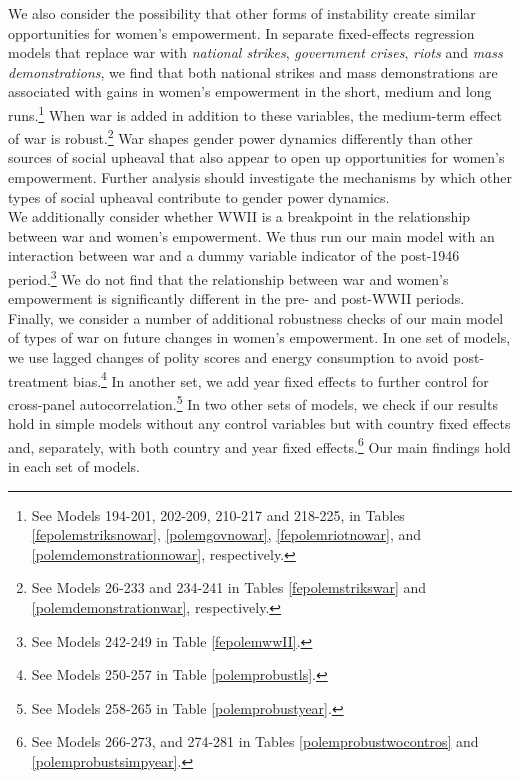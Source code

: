 We also consider the possibility that other forms of instability create similar opportunities for women's empowerment. In separate fixed-effects regression models that replace war with {\it national strikes}, {\it government crises}, {\it riots} and {\it mass demonstrations}, we find that both national strikes and mass demonstrations are associated with gains in women's empowerment in the short, medium and long runs.\footnote{See Models 194-201, 202-209, 210-217 and 218-225, in Tables \ref{fepolemstriksnowar}, \ref{polemgovnowar}, \ref{fepolemriotnowar}, and \ref{polemdemonstrationnowar}, respectively. } When war is added in addition to these variables, the medium-term effect of war is robust.\footnote{See Models 26-233 and 234-241 in Tables \ref{fepolemstrikswar} and \ref{polemdemonstrationwar}, respectively. } War shapes gender power dynamics differently than other sources of social upheaval that also appear to open up opportunities for women's empowerment. Further analysis should investigate the mechanisms by which other types of social upheaval contribute to gender power dynamics.\\

We additionally consider whether WWII is a breakpoint in the relationship between war and women's empowerment. We thus run our main  model with an interaction between war and a dummy variable indicator of the post-1946 period.\footnote{See Models 242-249 in Table \ref{fepolemwwII}.} We do not find that the relationship between war and women's empowerment is significantly different in the pre- and post-WWII periods.\\

Finally, we consider a number of additional robustness checks of our main model of types of war on future changes in women's empowerment. In one set of models, we use lagged changes of polity scores and energy consumption to avoid post-treatment bias.\footnote{See Models 250-257 in Table \ref{polemprobustls}.} In another set, we add year fixed effects to further control for cross-panel autocorrelation.\footnote{See Models 258-265 in Table \ref{polemprobustyear}.} In two other sets of models, we check if our results hold in simple models without any control variables but with country fixed effects and, separately, with both country and year fixed effects.\footnote{See Models 266-273, and 274-281 in Tables \ref{polemprobustwocontros} and \ref{polemprobustsimpyear}.} Our main findings hold in each set of models.\\


{\renewcommand\normalsize{\tiny}%
	\normalsize
}

